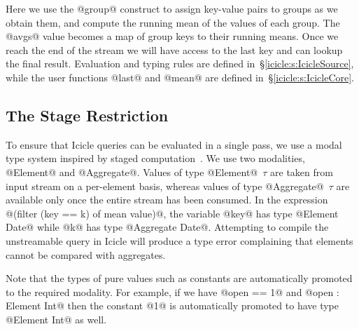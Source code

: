 Here we use the @group@ construct to assign key-value pairs to groups as we obtain them, and compute the running mean of the values of each group. The @avgs@ value becomes a map of group keys to their running means. Once we reach the end of the stream we will have access to the last key and can lookup the final result.
Evaluation and typing rules are defined in~\S\ref{icicle:s:IcicleSource}, while the user functions @last@ and @mean@ are defined in~\S\ref{icicle:s:IcicleCore}.


\subsection{The Stage Restriction}
To ensure that Icicle queries can be evaluated in a single pass, we use a modal type system inspired by staged computation~\cite{davies2001modal}. We use two modalities, @Element@ and @Aggregate@. Values of type @Element@~$\tau$ are taken from input stream on a per-element basis, whereas values of type @Aggregate@~$\tau$ are available only once the entire stream has been consumed. In the expression @(filter (key == k) of mean value)@, the variable @key@ has type @Element Date@ while @k@ has type @Aggregate Date@. Attempting to compile the unstreamable query in Icicle will produce a type error complaining that elements cannot be compared with aggregates.

Note that the types of pure values such as constants are automatically promoted to the required modality. For example, if we have @open == 1@ and @open : Element Int@ then the constant @1@ is automatically promoted to have type @Element Int@ as well.


